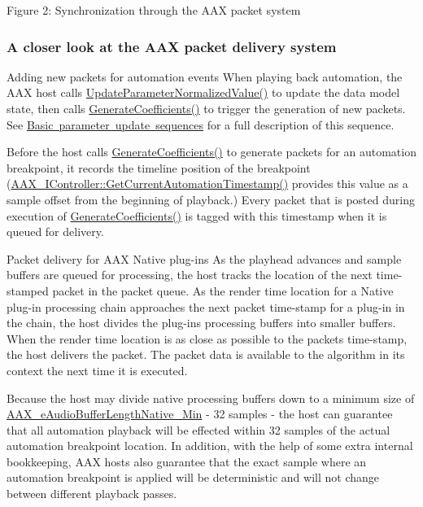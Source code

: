  Figure 2\+: Synchronization through the A\+AX packet system\hypertarget{a00821_parameterUpdateTiming_packet_delivery}{}\subsubsection{A closer look at the A\+A\+X packet delivery system}\label{a00821_parameterUpdateTiming_packet_delivery}
\begin{DoxyParagraph}{Adding new packets for automation events}
When playing back automation, the A\+AX host calls \mbox{\hyperlink{a01669_a685858711efb8634ce66c327f2865c71}{Update\+Parameter\+Normalized\+Value()}} to update the data model state, then calls \mbox{\hyperlink{a01669_a083265b008921b6114ede387711694b7}{Generate\+Coefficients()}} to trigger the generation of new packets. See \mbox{\hyperlink{a00823}{Basic parameter update sequences}} for a full description of this sequence.

Before the host calls \mbox{\hyperlink{a01669_a083265b008921b6114ede387711694b7}{Generate\+Coefficients()}} to generate packets for an automation breakpoint, it records the timeline position of the breakpoint (\mbox{\hyperlink{a01789_af9ab9b228023e116f89249a56c27a20f}{A\+A\+X\+\_\+\+I\+Controller\+::\+Get\+Current\+Automation\+Timestamp()}} provides this value as a sample offset from the beginning of playback.) Every packet that is posted during execution of \mbox{\hyperlink{a01669_a083265b008921b6114ede387711694b7}{Generate\+Coefficients()}} is tagged with this timestamp when it is queued for delivery. 
\end{DoxyParagraph}


\begin{DoxyParagraph}{Packet delivery for A\+AX Native plug-\/ins}
As the playhead advances and sample buffers are queued for processing, the host tracks the location of the next time-\/stamped packet in the packet queue. As the render time location for a Native plug-\/in processing chain approaches the next packet time-\/stamp for a plug-\/in in the chain, the host divides the plug-\/in\textquotesingle{}s processing buffers into smaller buffers. When the render time location is as close as possible to the packet\textquotesingle{}s time-\/stamp, the host delivers the packet. The packet data is available to the algorithm in its context the next time it is executed.

Because the host may divide native processing buffers down to a minimum size of \mbox{\hyperlink{a00491_aa1769ee466fd07659d8c7ef5ac61cd49a5819a4956c053084b094f686c920598e}{A\+A\+X\+\_\+e\+Audio\+Buffer\+Length\+Native\+\_\+\+Min}} -\/ 32 samples -\/ the host can guarantee that all automation playback will be effected within 32 samples of the actual automation breakpoint location. In addition, with the help of some extra internal bookkeeping, A\+AX hosts also guarantee that the exact sample where an automation breakpoint is applied will be deterministic and will not change between different playback passes. 
\end{DoxyParagraph}


